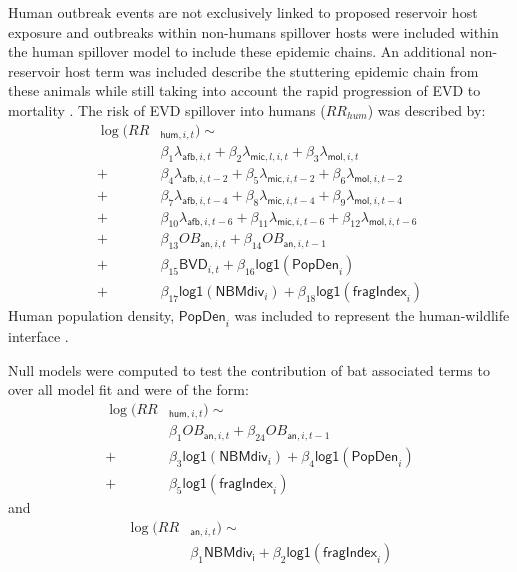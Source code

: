 \documentclass[9pt,twoside,lineno]{pnas-new}
\newcommand{\afb}{\mathsf{afb}}
\newcommand{\mic}{\mathsf{mic}}
\newcommand{\mol}{\mathsf{mol}}
\newcommand{\logplus}{\mathsf{log1}}
\begin{document}
Human outbreak events are not exclusively linked to proposed reservoir host exposure \cite{Pourrut2005TheAfrica} and outbreaks within non-humans spillover hosts were included within the human spillover model to include these epidemic chains. An additional non-reservoir host term was included describe the stuttering epidemic chain from these animals while still taking into account the rapid progression of EVD to mortality \cite{Swanepoel1996ExperimentalVirus}. The risk of EVD spillover into humans ($RR_{hum}$) was described by:
\[
    \begin{split}
\log(RR&_{\mathsf{hum}, i, t}) \sim \\
&\beta_1 \lambda_{\afb, i, t} + \beta_2 \lambda_{\mic, l, i, t} + \beta_3 \lambda_{\mol, i, t} \\
 + &\beta_4 \lambda_{\afb, i, t-2} + \beta_5 \lambda_{\mic, i, t-2} + \beta_6 \lambda_{\mol, i, t-2} \\
 + &\beta_7 \lambda_{\afb, i, t-4} + \beta_8 \lambda_{\mic, i, t-4} + \beta_9 \lambda_{\mol, i, t-4} \\
 + &\beta_{10} \lambda_{\afb, i, t-6} + \beta_{11} \lambda_{\mic, i, t-6} + \beta_{12} \lambda_{\mol, i, t-6} \\
 + &\beta_{13} OB_{\mathsf{an}, i, t} + \beta_{14} OB_{\mathsf{an},i, t-1}  \\
 +&\beta_{15} \mathsf{BVD}_{i,t} + \beta_{16} \logplus(\mathsf{PopDen}_{i})  \\
 + &\beta_{17} \logplus(\mathsf{NBM div}_{i}) + \beta_{18} \logplus(\mathsf{fragIndex}_{i})  
    \end{split}
\]
Human population density, $\mathsf{PopDen}_{i}$ was included to represent the human-wildlife interface \cite{Plowright2015EcologicalSpillover.}.  \par
Null models were computed to test the contribution of bat associated terms to over all model fit and were of the form:
\[
\begin{split}
   \log(RR&_{\mathsf{hum}, i, t}) \sim \\ 
   &\beta_{1} OB_{\mathsf{an}, i, t} + \beta_{24} OB_{\mathsf{an}, i, t-1}  \\
 +&\beta_{3} \logplus(\mathsf{NBM div}_{i}) + \beta_{4} \logplus(\mathsf{PopDen}_{i})  \\
 + &\beta_{5} \logplus(\mathsf{fragIndex}_{i})
\end{split}
\]
and 
\[
\begin{split}
   \log(RR& _{\mathsf{an}, i, t}) \sim \\
   & \beta_1 \mathsf{NBM div_i} + \beta_2 \logplus(\mathsf{fragIndex}_{i})
\end{split}
\]
\end{document}
